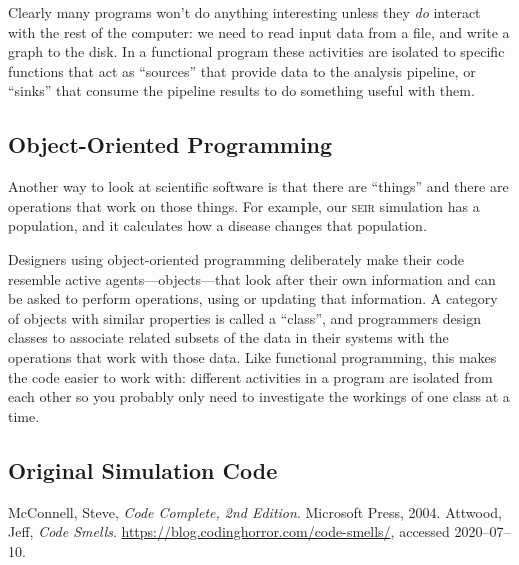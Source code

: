 \documentclass[a4paper]{article}
\begin{document}
Clearly many programs won't do anything interesting unless they \emph{do} interact with the rest of the computer: we need to read input data from a file, and write a graph to the disk.
In a functional program these activities are isolated to specific functions that act as ``sources'' that provide data to the analysis pipeline, or ``sinks'' that consume the pipeline results to do something useful with them.

\subsection{Object-Oriented Programming}
Another way to look at scientific software is that there are ``things'' and there are operations that work on those things.
For example, our \textsc{seir} simulation has a population, and it calculates how a disease changes that population.

Designers using object-oriented programming deliberately make their code resemble active agents---objects---that look after their own information and can be asked to perform operations, using or updating that information.
A category of objects with similar properties is called a ``class'', and programmers design classes to associate related subsets of the data in their systems with the operations that work with those data.
Like functional programming, this makes the code easier to work with: different activities in a program are isolated from each other so you probably only need to investigate the workings of one class at a time.

\begin{appendices}
\section{Original Simulation Code\label{code-appendix}}



\end{appendices}

\begin{thebibliography}{9}
   McConnell, Steve, \textit{Code Complete, 2nd Edition}. Microsoft Press, 2004.
   Attwood, Jeff, \textit{Code Smells}. \url{https://blog.codinghorror.com/code-smells/}, accessed 2020--07--10.
\end{thebibliography}
\end{document}

